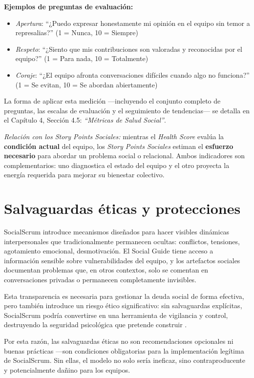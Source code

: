 \textbf{Ejemplos de preguntas de evaluación:}
\begin{itemize}
    \item \textit{Apertura}: ``¿Puedo expresar honestamente mi opinión en el equipo sin temor a represalias?'' (1 = Nunca, 10 = Siempre)
    \item \textit{Respeto}: ``¿Siento que mis contribuciones son valoradas y reconocidas por el equipo?'' (1 = Para nada, 10 = Totalmente)
    \item \textit{Coraje}: ``¿El equipo afronta conversaciones difíciles cuando algo no funciona?'' (1 = Se evitan, 10 = Se abordan abiertamente)
\end{itemize}

La forma de aplicar esta medición —incluyendo el conjunto completo de preguntas, las escalas de evaluación y el seguimiento de tendencias— se detalla en el Capítulo 4, Sección 4.5: \textit{``Métricas de Salud Social''}.

\emph{Relación con los Story Points Sociales:} mientras el \textit{Health Score} evalúa la \textbf{condición actual} del equipo, los \textit{Story Points Sociales} estiman el \textbf{esfuerzo necesario} para abordar un problema social o relacional. Ambos indicadores son complementarios: uno diagnostica el estado del equipo y el otro proyecta la energía requerida para mejorar su bienestar colectivo.

\FloatBarrier

\section{Salvaguardas éticas y protecciones}

SocialScrum introduce mecanismos diseñados para hacer visibles dinámicas interpersonales que tradicionalmente permanecen ocultas: conflictos, tensiones, agotamiento emocional, desmotivación. El Social Guide tiene acceso a información sensible sobre vulnerabilidades del equipo, y los artefactos sociales documentan problemas que, en otros contextos, solo se comentan en conversaciones privadas o permanecen completamente invisibles.

Esta transparencia es necesaria para gestionar la deuda social de forma efectiva, pero también introduce un riesgo ético significativo: sin salvaguardas explícitas, SocialScrum podría convertirse en una herramienta de vigilancia y control, destruyendo la seguridad psicológica que pretende construir \cite{mayer_integrative_1995}.

Por esta razón, las salvaguardas éticas no son recomendaciones opcionales ni buenas prácticas —son condiciones obligatorias para la implementación legítima de SocialScrum. Sin ellas, el modelo no solo sería ineficaz, sino contraproducente y potencialmente dañino para los equipos.

